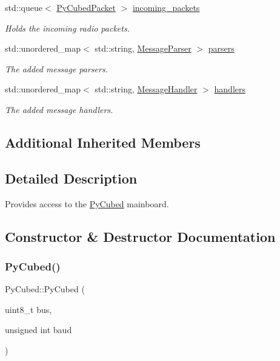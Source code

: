 \begin{DoxyCompactItemize}
std\+::queue$<$ \hyperlink{structcubesat_1_1PyCubedPacket}{Py\+Cubed\+Packet} $>$ \hyperlink{classcubesat_1_1PyCubed_a909673179f44b10128f01bd579bc13ba}{incoming\+\_\+packets}
\begin{DoxyCompactList}\small\item\em Holds the incoming radio packets. \end{DoxyCompactList}\item 
std\+::unordered\+\_\+map$<$ std\+::string, \hyperlink{structcubesat_1_1PyCubed_1_1MessageParser}{Message\+Parser} $>$ \hyperlink{classcubesat_1_1PyCubed_a284d1cfcdd19675e2b96913018192928}{parsers}
\begin{DoxyCompactList}\small\item\em The added message parsers. \end{DoxyCompactList}\item 
std\+::unordered\+\_\+map$<$ std\+::string, \hyperlink{structcubesat_1_1PyCubed_1_1MessageHandler}{Message\+Handler} $>$ \hyperlink{classcubesat_1_1PyCubed_aacc466db4b35e383eedd385db64522a1}{handlers}
\begin{DoxyCompactList}\small\item\em The added message handlers. \end{DoxyCompactList}\end{DoxyCompactItemize}
\subsection*{Additional Inherited Members}


\subsection{Detailed Description}
Provides access to the \hyperlink{classcubesat_1_1PyCubed}{Py\+Cubed} mainboard. 

\subsection{Constructor \& Destructor Documentation}
\mbox{\label{classcubesat_1_1PyCubed_a30b6d7ca9cc3d8d4151eca7525c9dc61}} 
\subsubsection{\texorpdfstring{Py\+Cubed()}{PyCubed()}}
{\footnotesize\ttfamily Py\+Cubed\+::\+Py\+Cubed (\begin{DoxyParamCaption}\item[{uint8\+\_\+t}]{bus,  }\item[{unsigned int}]{baud }\end{DoxyParamCaption})}



